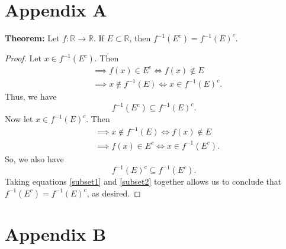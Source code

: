 \documentclass{article}
\begin{document}
\begin{appendices}
	
\section{Appendix A}
\label{appendix:A}
\textbf{Theorem:} Let $f:\mathbb{R}\rightarrow\mathbb{R}$. If $E \subset \mathbb{R}$, then $f^{-1}(E^c) = f^{-1}(E)^c$.
\begin{proof}
	Let $x \in f^{-1}(E^c)$. Then
	\begin{align}
		&\implies f(x) \in E^c \iff f(x) \notin E \\
		&\implies x \notin f^{-1}(E) \iff x \in f^{-1}(E)^c.
	\end{align}
	Thus, we have
	\begin{equation}\label{subset1}
		f^{-1}(E^c) \subseteq f^{-1}(E)^c.
	\end{equation}
	Now let $x\in f^{-1}(E)^c$. Then
	\begin{align}
		&\implies x \notin f^{-1}(E) \iff f(x) \notin E \\
		&\implies f(x) \in E^c \iff x \in f^{-1}(E^c).
	\end{align}
	So, we also have
	\begin{equation}\label{subset2}
		f^{-1}(E)^c \subseteq f^{-1}(E^c).
	\end{equation}
	Taking equations \eqref{subset1} and \eqref{subset2} together allows us to conclude that \\$f^{-1}(E^c) = f^{-1}(E)^c$, as desired.
\end{proof}
\section{Appendix B}
\label{appendix:B}


\end{appendices}
\end{document}
